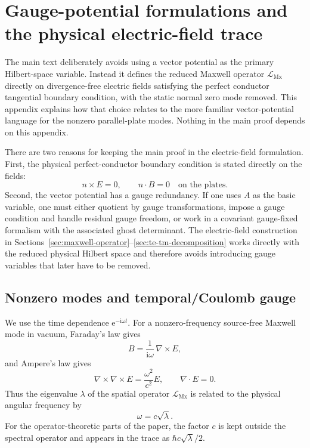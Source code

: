 \documentclass[11pt]{article}
\providecommand{\ii}{\mathrm{i}}
\providecommand{\ee}{\mathrm{e}}
\providecommand{\LMx}{\mathcal L_{\mathrm{Mx}}}
\numberwithin{equation}{section}
\begin{document}
\section{Gauge-potential formulations and the physical electric-field trace}
\label{app:optional-gauge-comment}

The main text deliberately avoids using a vector potential as the primary
Hilbert-space variable.  Instead it defines the reduced Maxwell operator
\(\LMx\) directly on divergence-free electric fields satisfying the perfect
conductor tangential boundary condition, with the static normal zero mode
removed.  This appendix explains how that choice relates to the more familiar
vector-potential language for the nonzero parallel-plate modes.  Nothing in the
main proof depends on this appendix.

There are two reasons for keeping the main proof in the electric-field
formulation.  First, the physical perfect-conductor boundary condition is
stated directly on the fields:
\begin{equation}
    n\times E=0,
    \qquad
    n\cdot B=0
    \quad \text{on the plates}.
    \label{eq:PEC-field-conditions-appendixC}
\end{equation}
Second, the vector potential has a gauge redundancy.  If one uses \(A\) as the
basic variable, one must either quotient by gauge transformations, impose a
gauge condition and handle residual gauge freedom, or work in a covariant
gauge-fixed formalism with the associated ghost determinant.  The electric-field
construction in Sections~\ref{sec:maxwell-operator}--\ref{sec:te-tm-decomposition}
works directly with the reduced physical Hilbert space and therefore avoids
introducing gauge variables that later have to be removed.

\subsection{Nonzero modes and temporal/Coulomb gauge}
\label{subsec:nonzero-modes-temporal-coulomb}

We use the time dependence \(\ee^{-\ii\omega t}\).  For a nonzero-frequency
source-free Maxwell mode in vacuum, Faraday's law gives
\begin{equation}
    B=\frac{1}{\ii\omega}\,\nabla\times E,
    \label{eq:B-from-E-appendixC}
\end{equation}
and Ampere's law gives
\begin{equation}
    \nabla\times\nabla\times E
    =\frac{\omega^2}{c^2}E,
    \qquad
    \nabla\cdot E=0 .
    \label{eq:E-curlcurl-nonzero-appendixC}
\end{equation}
Thus the eigenvalue \(\lambda\) of the spatial operator \(\LMx\) is related to
the physical angular frequency by
\begin{equation}
    \omega=c\sqrt{\lambda}.
    \label{eq:omega-lambda-appendixC}
\end{equation}
For the operator-theoretic parts of the paper, the factor \(c\) is kept outside
the spectral operator and appears in the trace as \(\hbar c\sqrt{\lambda}/2\).
\end{document}
